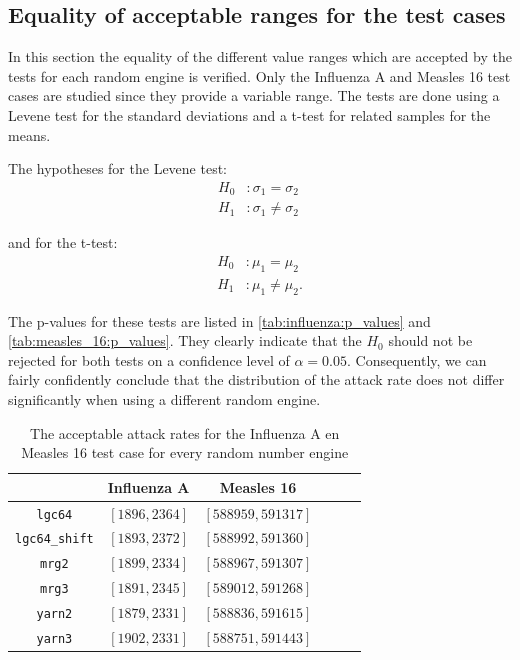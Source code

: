 \documentclass[natbib=true]{acmart}
\begin{document}
\subsection{Equality of acceptable ranges for the test cases}

In this section the equality of the different value ranges which are accepted by the tests for each random engine is verified. Only the Influenza A and Measles 16 test cases are studied since they provide a variable range. The tests are done using a Levene test for the standard deviations and a t-test for related samples for the means.

The hypotheses for the Levene test:
\[
\begin{aligned}
 H_0 &: \sigma_1 = \sigma_2\\
 H_1 &: \sigma_1 \ne \sigma_2\
\end{aligned}
\]

and for the t-test:
\[
\begin{aligned}
 H_0 &: \mu_1 = \mu_2  \\
 H_1 &: \mu_1 \ne \mu_2.
\end{aligned}
\]

The p-values for these tests are listed in \cref{tab:influenza:p_values} and \cref{tab:measles_16:p_values}. They clearly indicate that the \(H_0\) should not be rejected for both tests on a confidence level of $\alpha = 0.05$. Consequently, we can fairly confidently conclude that the distribution of the attack rate does not differ significantly when using a different random engine.


\begin{table}[!hbt]
    \centering
    \bgroup
    \def\arraystretch{2}
    \begin{tabular}{c|c|c|c|c|c}
                                & \textbf{Influenza A}  & \textbf{Measles 16} \\ \hline
        \texttt{lgc64}          & \([1896, 2364]\)       & \([588959, 591317]\) \\
        \texttt{lgc64\_shift}   & \([1893, 2372]\)       & \([588992, 591360]\) \\
        \texttt{mrg2}           & \([1899, 2334]\)       & \([588967, 591307]\) \\
        \texttt{mrg3}           & \([1891, 2345]\)       & \([589012, 591268]\) \\
        \texttt{yarn2}          & \([1879, 2331]\)       & \([588836, 591615]\) \\
        \texttt{yarn3}          & \([1902, 2331]\)       & \([588751, 591443]\) \\
    \end{tabular}
    \egroup
    \caption{The acceptable attack rates for the Influenza A en Measles 16 test case for every random number engine}
    \label{tab:ranges_engines}
\end{table}
\end{document}
